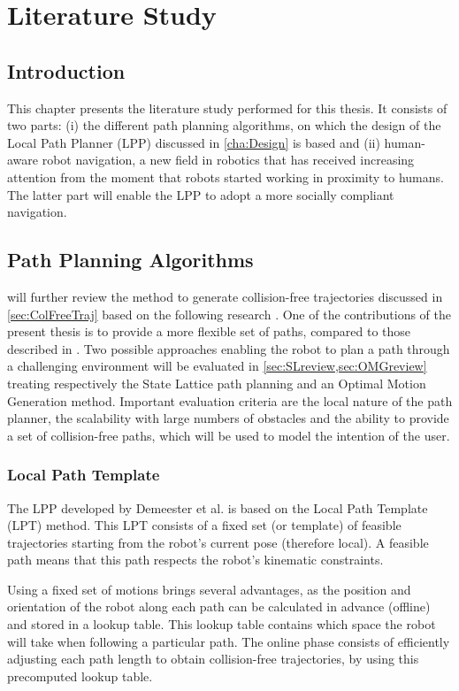 \chapter{Literature Study} \label{cha:LitStudy}

\section{Introduction}
This chapter presents the literature study performed for this thesis. It consists of two parts: (i) the different path planning algorithms, on which the design of the Local Path Planner (LPP) discussed in \cref{cha:Design} is based and (ii) human-aware robot navigation, a new field in robotics that has received increasing attention from the moment that robots started working in proximity to humans. The latter part will enable the LPP to adopt a more socially compliant navigation.

\section{Path Planning Algorithms}
 will further review the method to generate collision-free trajectories discussed in \cref{sec:ColFreeTraj} based on the following research \cite{DemeesterEtAl2012}. One of the contributions of the present thesis is to provide a more flexible set of paths, compared to those described in \cite{DemeesterEtAl2012}. Two possible approaches enabling the robot to plan a path through a challenging environment will be evaluated in \cref{sec:SLreview,sec:OMGreview} treating respectively the State Lattice path planning and an Optimal Motion Generation method. Important evaluation criteria are the local nature of the path planner, the scalability with large numbers of obstacles and the ability to provide a set of collision-free paths, which will be used to model the intention of the user.

\subsection{Local Path Template} \label{sec:LPTreview}
The LPP developed by Demeester et al. \cite{DemeesterEtAl2012} is based on the Local Path Template (LPT) method. This LPT consists of a fixed set (or template) of feasible trajectories starting from the robot's current pose (therefore local). A feasible path means that this path respects the robot's kinematic constraints.

Using a fixed set of motions brings several advantages, as the position and orientation of the robot along each path can be calculated in advance (offline) and stored in a lookup table. This lookup table contains which space the robot will take when following a particular path. The online phase consists of efficiently adjusting each path length to obtain collision-free trajectories, by using this precomputed lookup table.

